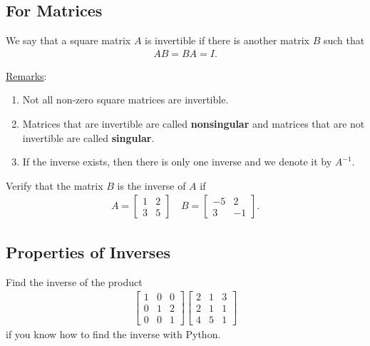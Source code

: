 \documentclass[12pt,a4paper]{article}
\newcounter{example}[section]
\begin{document}
\subsection{For Matrices}
We say that a square matrix $A$ is invertible if there is another matrix $B$ such that
	\begin{align*}
	A B = BA = I .
	\end{align*}
	
\noindent\underline{Remarks}:
		\begin{enumerate}[\textbullet]
		\item Not all non-zero square matrices are invertible.
		\item Matrices that are invertible are called \textbf{nonsingular} and matrices that are not invertible are called \textbf{singular}.
		\item If the inverse exists, then there is only one inverse and we denote it by $A^{-1}$.
		\end{enumerate}
	
\begin{example}
Verify that the matrix $B$ is the inverse of $A$ if
	\begin{align*}
	A = \begin{bmatrix}
	1 & 2 \\ 3 & 5
	\end{bmatrix}
	\quad
	B = \begin{bmatrix}
	-5 & 2 \\ 3 & -1
	\end{bmatrix} .
	\end{align*}
\end{example}

\newpage

\subsection{Properties of Inverses}

\begin{example}
Find the inverse of the product
	\begin{align*}
	\begin{bmatrix}
	1 & 0 & 0 \\ 0 & 1 & 2 \\ 0 & 0 & 1
	\end{bmatrix} 
	\begin{bmatrix}
	2 & 1 & 3 \\ 2 & 1 & 1 \\ 4 & 5 & 1
	\end{bmatrix}
	\end{align*}
if you know how to find the inverse with Python.
\end{example}
\end{document}
